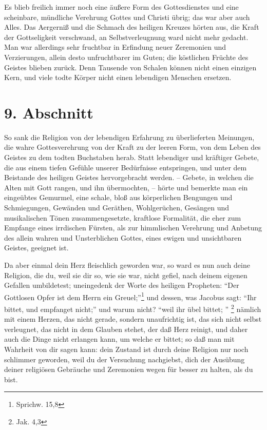 Es blieb freilich immer noch eine äußere Form des Gottesdienstes und eine scheinbare, mündliche Verehrung Gottes und Christi übrig; das war aber auch Alles. Das Aergerniß und die Schmach des heiligen Kreuzes hörten aus, die Kraft der Gottseligkeit verschwand, an Selbstverleugnung ward nicht mehr gedacht. Man war allerdings sehr fruchtbar in Erfindung neuer Zeremonien und Verzierungen, allein desto unfruchtbarer im Guten; die köstlichen Früchte des Geistes blieben zurück. Denn Tausende von Schalen können nicht einen einzigen Kern, und viele todte Körper nicht einen lebendigen Menschen ersetzen.

\section{9. Abschnitt}

So sank die Religion von der lebendigen Erfahrung zu überlieferten Meinungen, die wahre Gottesverehrung von der Kraft zu der leeren Form, von dem Leben des Geistes zu dem todten Buchstaben herab. Statt lebendiger und kräftiger Gebete, die aus einem tiefen Gefühle unserer Bedürfnisse entspringen, und unter dem Beistande des heiligen Geistes hervorgebracht werden. -- Gebete, in welchen die Alten mit Gott rangen, und ihn übermochten, -- hörte und bemerkte man ein eingeübtes Gemurmel, eine schale, bloß aus körperlichen Bengungen und Schmiegungen, Gewänden und Geräthen, Wohlgerüchen, Gesängen und musikalischen Tönen zusammengesetzte, kraftlose Formalität, die eher zum Empfange eines irrdischen Fürsten, als zur himmlischen Verehrung und Anbetung des allein wahren und Unsterblichen Gottes, eines ewigen und unsichtbaren Geistes, geeignet ist.

Da aber einmal dein Herz fleischlich geworden war, so ward es nun auch deine
Religion, die du, weil sie dir so, wie sie war, nicht gefiel, nach deinem
eigenen Gefallen umbildetest; uneingedenk der Worte des heiligen Propheten:
"`Der Gottlosen Opfer ist dem Herrn ein Greuel;"'\footnote{Sprichw. 15,8} und
dessen, was Jacobus sagt: "`Ihr bittet, und empfanget nicht;"' und warum
nicht? "`weil ihr übel bittet; "' \footnote{Jak. 4,3} nämlich mit einem
Herzen, das nicht gerade, sondern unaufrichtig ist, das sich nicht selbst
verleugnet, das nicht in dem Glauben stehet, der daß Herz reinigt, und daher
auch die Dinge nicht erlangen kann, um welche er bittet; so daß man mit
Wahrheit von dir sagen kann: dein Zustand ist durch deine Religion nur noch
schlimmer geworden, weil du der Versuchung nachgiebst, dich der Ausübung
deiner religiösen Gebräuche und Zeremonien wegen für besser zu halten, als du bist.

